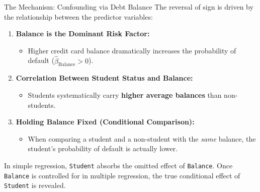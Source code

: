 \documentclass[aspectratio=169, 11pt]{beamer}
\begin{document}
\begin{frame}{The Mechanism: Confounding via Debt Balance}
The reversal of sign is driven by the relationship between the predictor variables:

\begin{enumerate}
    \item \textbf{Balance is the Dominant Risk Factor:}
    \begin{itemize}
        \item Higher credit card balance dramatically increases the probability of default ($\hat{\beta}_{\text{Balance}} > 0$).
    \end{itemize}
    \item \textbf{Correlation Between Student Status and Balance:}
    \begin{itemize}
        \item Students systematically carry \textbf{higher average balances} than non-students.
    \end{itemize}
    \item \textbf{Holding Balance Fixed (Conditional Comparison):}
    \begin{itemize}
        \item When comparing a student and a non-student with the \emph{same} balance, the student's probability of default is actually lower.
    \end{itemize}
\end{enumerate}

\vspace{0.1cm}
\begin{tcolorbox}[colback=blue!5!white,colframe=blue!75!black,title=Confounding / Simpson's Paradox Summary]
In simple regression, \texttt{Student} absorbs the omitted effect of \texttt{Balance}. Once \texttt{Balance} is controlled for in multiple regression, the true conditional effect of \texttt{Student} is revealed.
\end{tcolorbox}
\end{frame}
\end{document}
